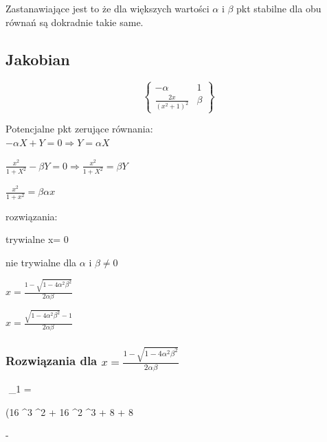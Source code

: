 \documentclass{article}
\begin{document}
    Zastanawiające jest to że dla większych wartości $\alpha$ i $\beta$ pkt stabilne  dla obu równań są dokradnie takie same.

    \newpage
    \subsection{Jakobian}

    \begin{center}
        $$
        \left\{
            \begin{matrix}
                -\alpha & 1 \\
                \frac{2 x}{(x^2+1)^2} & \beta
            \end{matrix}
        \right\}
        $$
    \end{center}

    Potencjalne pkt zerujące równania:\\
    $-\alpha X+Y = 0 \Rightarrow Y = \alpha X$

    $ \frac{x^2}{1+X^2}-\beta Y = 0 \Rightarrow \frac{x^2}{1+X^2} = \beta Y$

    $\frac{x^2}{1+x^2} = \beta  \alpha x$

    rozwiązania:

    trywialne x= 0

    nie trywialne dla $\alpha$ i $\beta \neq 0$

    $x = \frac{1-\sqrt{1 - 4 \alpha^2 \beta^2}}{2 \alpha \beta}$

    $x = \frac{\sqrt{1 - 4 \alpha^2 \beta^2}-1}{2 \alpha \beta}$

    \subsubsection{Rozwiązania dla $x = \frac{1-\sqrt{1 - 4 \alpha^2 \beta^2}}{2 \alpha \beta}$}

    $$
         \lambda_1 =

    (16 \alpha^3 \beta^2
    + 16 \alpha^2 \beta^3
    + 8 \alpha {}
    + 8 \beta {}

    \vspace{0.5cm}
    -
\end{document}
